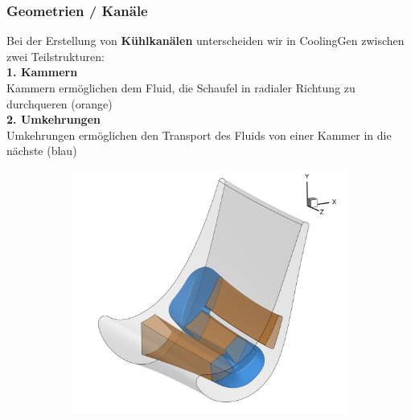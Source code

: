 \documentclass[8pt, aspectratio=169]{beamer}
\begin{document}
\begin{frame}
	\frametitle{Geometrien / Kanäle}
	\vspace{-0.25cm}\hspace{-0.5cm}
	\begin{minipage}[t]{\textwidth}
		Bei der Erstellung von \textbf{Kühlkanälen} unterscheiden wir in CoolingGen zwischen zwei Teilstrukturen:\\[-.8em]

		\textbf{1. Kammern}\\
		Kammern ermöglichen dem Fluid, die Schaufel in radialer Richtung zu durchqueren (orange)\\[-.8em]
		
		\textbf{2. Umkehrungen}\\
		Umkehrungen ermöglichen den Transport des Fluids von einer Kammer in die nächste (blau)\\[-.8em]
	\end{minipage}
	\centering
	\begin{minipage}[t]{.8\textwidth}
		\begin{figure}[H]
			\centering
			\begin{subfigure}{.49\textwidth}
				\includegraphics[width=\textwidth]{../../tec/complete/020.png}
			\end{subfigure}
			\begin{subfigure}{.49\textwidth}
				\centering

\end{subfigure}
\end{figure}
\end{minipage}
\end{frame}
\end{document}
